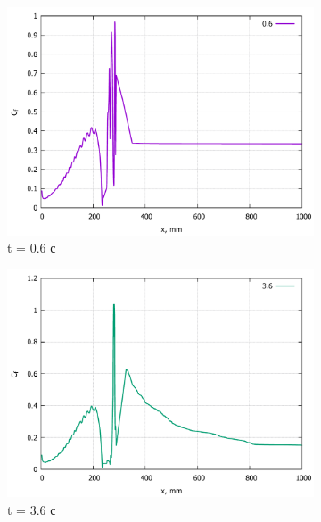 	\begin{figure}[H]
		\begin{subfigure}{.5\textwidth}
			\centering
			\includegraphics[width=1\linewidth]{../Assets/Cf-T06}
			\caption{t = 0.6 с}
			\label{fig:Cf-T06}
		\end{subfigure}%
		\begin{subfigure}{.5\textwidth}
			\centering
			\includegraphics[width=1\linewidth]{../Assets/Cf-T360}
			\caption{t = 3.6 с}
			\label{fig:Cf-T360}
		\end{subfigure}
		\\
		\begin{subfigure}{.5\textwidth}
			\centering

\end{subfigure}
\end{figure}
